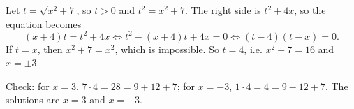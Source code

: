 Let $t=\sqrt{x^2+7}$, so $t>0$ and $t^2=x^2+7$. The right side is $t^2+4x$, so the equation becomes
\[(x+4)t=t^2+4x\iff t^2-(x+4)t+4x=0\iff(t-4)(t-x)=0.\]
If $t=x$, then $x^2+7=x^2$, which is impossible. So $t=4$, i.e. $x^2+7=16$ and $x=\pm3$.

Check: for $x=3$, $7\cdot4=28=9+12+7$; for $x=-3$, $1\cdot4=4=9-12+7$. The solutions are $\boxed{x=3\text{ and }x=-3}$.
